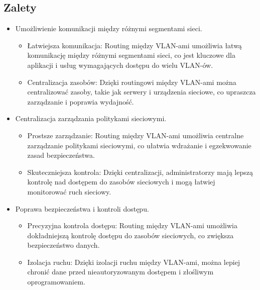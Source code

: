 \subsection{Zalety}
\begin{itemize}
    \item Umożliwienie komunikacji między różnymi segmentami sieci.
    \begin{itemize}
        \item Łatwiejsza komunikacja: Routing między VLAN-ami umożliwia łatwą komunikację między różnymi segmentami sieci, co jest kluczowe dla aplikacji i usług wymagających dostępu do wielu VLAN-ów.
        \item Centralizacja zasobów: Dzięki routingowi między VLAN-ami można centralizować zasoby, takie jak serwery i urządzenia sieciowe, co upraszcza zarządzanie i poprawia wydajność.
    \end{itemize}
    \item Centralizacja zarządzania politykami sieciowymi.
    \begin{itemize}
        \item Prostsze zarządzanie: Routing między VLAN-ami umożliwia centralne zarządzanie politykami sieciowymi, co ułatwia wdrażanie i egzekwowanie zasad bezpieczeństwa.
        \item Skuteczniejsza kontrola: Dzięki centralizacji, administratorzy mają lepszą kontrolę nad dostępem do zasobów sieciowych i mogą łatwiej monitorować ruch sieciowy.
    \end{itemize}
    \item Poprawa bezpieczeństwa i kontroli dostępu.
    \begin{itemize}
        \item Precyzyjna kontrola dostępu: Routing między VLAN-ami umożliwia dokładniejszą kontrolę dostępu do zasobów sieciowych, co zwiększa bezpieczeństwo danych.
        \item Izolacja ruchu: Dzięki izolacji ruchu między VLAN-ami, można lepiej chronić dane przed nieautoryzowanym dostępem i złośliwym oprogramowaniem.
    \end{itemize}
\end{itemize}


